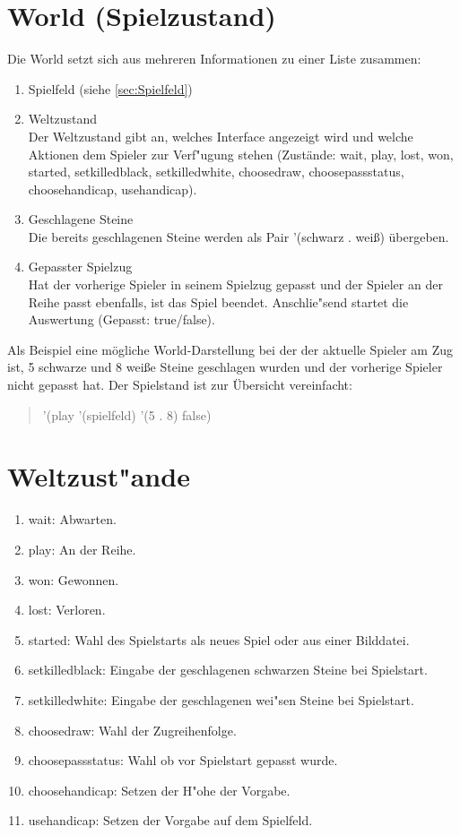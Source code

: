 \documentclass[a4paper]{scrreprt}
\begin{document}
\section{World (Spielzustand)}
\label{sec:World}
Die World setzt sich aus mehreren Informationen zu einer Liste zusammen:

\begin{enumerate}
\item Spielfeld (siehe \ref{sec:Spielfeld})
\item Weltzustand\\
Der Weltzustand gibt an, welches Interface angezeigt wird und welche Aktionen dem Spieler zur Verf"ugung stehen (Zustände: wait, play, lost, won, started, setkilledblack, setkilledwhite, choosedraw, choosepassstatus, choosehandicap, usehandicap).
\item Geschlagene Steine\\
Die bereits geschlagenen Steine werden als Pair '(schwarz . weiß) übergeben.
\item Gepasster Spielzug\\
Hat der vorherige Spieler in seinem Spielzug gepasst und der Spieler an der Reihe passt ebenfalls, ist das Spiel beendet. Anschlie"send startet die Auswertung (Gepasst: true/false). 
\end{enumerate}
Als Beispiel eine mögliche World-Darstellung bei der der aktuelle Spieler am Zug ist, 5 schwarze und 8 weiße Steine geschlagen wurden und der vorherige Spieler nicht gepasst hat. Der Spielstand ist zur Übersicht vereinfacht:
\begin{quotation}
 '(play '(spielfeld) '(5 . 8) false)
\end{quotation}
 
\section{Weltzust"ande}
\begin{enumerate}
\item wait: Abwarten.
\item play: An der Reihe.
\item won: Gewonnen.
\item lost: Verloren.
\item started: Wahl des Spielstarts als neues Spiel oder aus einer Bilddatei.
\item setkilledblack: Eingabe der geschlagenen schwarzen Steine bei Spielstart.
\item setkilledwhite: Eingabe der geschlagenen wei"sen Steine bei Spielstart.
\item choosedraw: Wahl der Zugreihenfolge.
\item choosepassstatus: Wahl ob vor Spielstart gepasst wurde.
\item choosehandicap: Setzen der H"ohe der Vorgabe.
\item usehandicap: Setzen der Vorgabe auf dem Spielfeld.
\end{enumerate}
 
\end{document}
